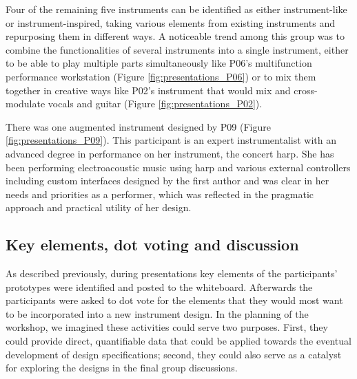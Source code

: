 \documentclass[letterpaper, 12pt]{article}
\begin{document}
Four of the remaining five instruments can be identified as either instrument-like or instrument-inspired, taking various elements from existing instruments and repurposing them in different ways. A noticeable trend among this group was to combine the functionalities of several instruments into a single instrument, either to be able to play multiple parts simultaneously like P06's multifunction performance workstation (Figure \ref{fig:presentations_P06}) or to mix them together in creative ways like P02's instrument that would mix and cross-modulate vocals and guitar (Figure \ref{fig:presentations_P02}). 

There was one augmented instrument designed by P09 (Figure \ref{fig:presentations_P09}). This participant is an expert instrumentalist with an advanced degree in performance on her instrument, the concert harp. She has been performing electroacoustic music using harp and various external controllers including custom interfaces designed by the first author \citep{Sullivan2018} and was clear in her needs and priorities as a performer, which was reflected in the pragmatic approach and practical utility of her design. 



\subsection{Key elements, dot voting and discussion}

As described previously, during presentations key elements of the participants' prototypes were identified and posted to the whiteboard. Afterwards the participants were asked to dot vote for the elements that they would most want to be incorporated into a new instrument design. In the planning of the workshop, we imagined these activities could serve two purposes. First, they could provide direct, quantifiable data that could be applied towards the eventual development of design specifications; second, they could also serve as a catalyst for exploring the designs in the final group discussions.
\end{document}
